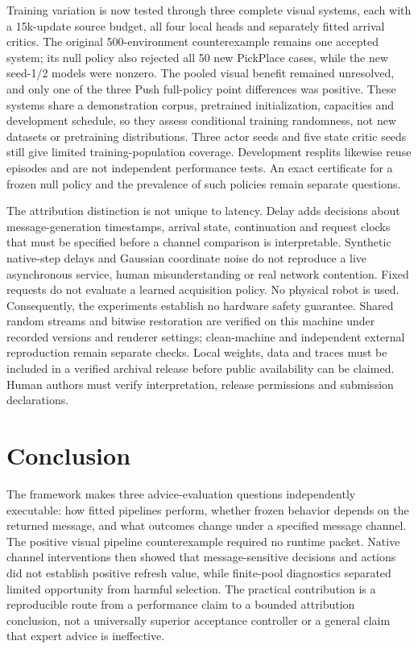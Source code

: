 Training variation is now tested through three complete visual systems, each with a 15k-update source budget, all four local heads and separately fitted arrival critics. The original 500-environment counterexample remains one accepted system; its null policy also rejected all 50 new PickPlace cases, while the new seed-1/2 models were nonzero. The pooled visual benefit remained unresolved, and only one of the three Push full-policy point differences was positive. These systems share a demonstration corpus, pretrained initialization, capacities and development schedule, so they assess conditional training randomness, not new datasets or pretraining distributions. Three actor seeds and five state critic seeds still give limited training-population coverage. Development resplits likewise reuse episodes and are not independent performance tests. An exact certificate for a frozen null policy and the prevalence of such policies remain separate questions.

The attribution distinction is not unique to latency. Delay adds decisions about message-generation timestamps, arrival state, continuation and request clocks that must be specified before a channel comparison is interpretable. Synthetic native-step delays and Gaussian coordinate noise do not reproduce a live asynchronous service, human misunderstanding or real network contention. Fixed requests do not evaluate a learned acquisition policy. No physical robot is used. Consequently, the experiments establish no hardware safety guarantee. Shared random streams and bitwise restoration are verified on this machine under recorded versions and renderer settings; clean-machine and independent external reproduction remain separate checks. Local weights, data and traces must be included in a verified archival release before public availability can be claimed. Human authors must verify interpretation, release permissions and submission declarations.

\section{Conclusion}
The framework makes three advice-evaluation questions independently executable: how fitted pipelines perform, whether frozen behavior depends on the returned message, and what outcomes change under a specified message channel. The positive visual pipeline counterexample required no runtime packet. Native channel interventions then showed that message-sensitive decisions and actions did not establish positive refresh value, while finite-pool diagnostics separated limited opportunity from harmful selection. The practical contribution is a reproducible route from a performance claim to a bounded attribution conclusion, not a universally superior acceptance controller or a general claim that expert advice is ineffective.
